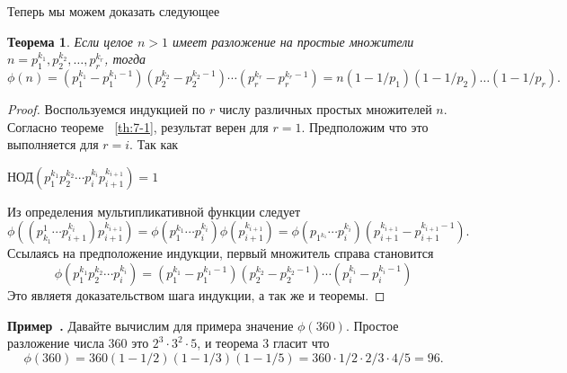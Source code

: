 \documentclass[11pt]{article}
\newtheorem{theorem}{Теорема}
\newcounter{example}[section]
\newenvironment{example}[1][]{\refstepcounter{example}\par\medskip
	\noindent \textbf{Пример~\theexample. #1} \rmfamily}{\medskip}
\begin{document}
\begin{center}
Теперь мы можем доказать следующее
\end{center}
\begin{theorem}
	Если целое $n>1$ имеет разложение на простые множители $n=p_{1}^{k_1},p_{2}^{k_2},\ldots, p_{r}^{k_r}$, тогда
	\[\phi(n) =(p_{1}^{k_1}-p_{1}^{k_{1}-1})(p_{2}^{k_{2}}-p_{2}^{k_{2}-1})\cdots (p_{r}^{k_{r}}-p_{r}^{k_{r}-1})=n(1-1/p_1)(1-1/p_2)\ldots(1-1/p_r).\]
\end{theorem}
\begin{proof}
	Воспользуемся индукцией по $r$ числу различных простых множителей $n$. Согласно теореме ~\ref{th:7-1}, результат верен для $r=1$. Предположим что это выполняется для $r=i$. Так как
\begin{center}
	$\text{НОД}(p^{k_1}_{1}p^{k_2}_{2}\cdots p^{k_i}_{i}p^{k_{i+1}}_{i+1})=1$
\end{center}
Из определения мультипликативной функции следует
\[\phi((p_{k_1}^{1}\cdots p^{k_i}_{i+1})p_{i+1}^{k_{i+1}})=\phi(p^{k_1}_{1}\cdots p_{i}^{k_i}) \phi(p_{i+1}^{k_{i+1}})=\phi(p_{1^{k_1}}\cdots p_{i}^{k_{i}})(p_{i+1}^{k_{i+1}}-p_{i+1}^{k_{i+1}-1}).\]
Ссылаясь на предположение индукции, первый множитель справа становится
\[\phi(p_{1}^{k_1}p_{2}^{k_2}\cdots p_{i}^{k_i})=(p_{1}^{k_1}-p_{1}^{k_1-1})(p_{2}^{k_2}-p_{2}^{k_2-1})\cdots
(p_{i}^{k_i}-p_{i}^{k_i-1})\]
Это являетя доказательством шага индукции, а так же и теоремы.
\end{proof}
\begin{example}
	Давайте вычислим для примера значение $\phi(360)$. Простое разложение числа $360$ это $2^3\cdot3^2\cdot5$, и теорема $3$ гласит что 
	\[\phi(360)=360(1-1/2)(1-1/3)(1-1/5)=360\cdot1/2\cdot2/3\cdot4/5=96.
	\]
\end{example}																					
\end{document}
